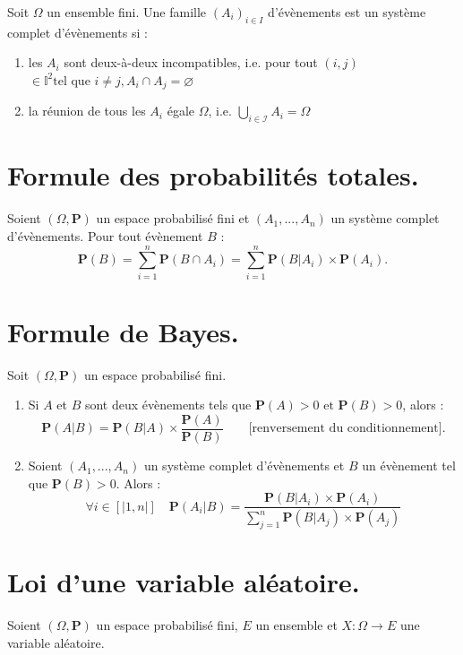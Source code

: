 \documentclass{article}
\begin{document}
Soit $\Omega$ un ensemble fini. Une famille $(A_i)_{i \in I}$ d'évènements est un système complet d'évènements si :
\begin{enumerate}[label=(\alph*)]
    \item les $ A_i $ sont deux-à-deux incompatibles, i.e. pour tout $ (i,j) $  $\in \mathbb{I}^2  \text{tel que } i \neq j, A_i \cap A_j = \varnothing $
    \item la réunion de tous les $A_i$ égale $\Omega$, i.e. $\bigcup_{i \in \mathcal{I}}A_i = \Omega$
\end{enumerate}

\section{Formule des probabilités totales.}

Soient $(\Omega, \mathbf{P})$ un espace probabilisé fini et $(A_1, ..., A_n)$ un système complet d'évènements. Pour tout évènement $B$ : 
\[
    \mathbf{P}(B) = \sum_{i=1}^{n}\mathbf{P}(B \cap A_i) = \sum_{i=1}^{n}\mathbf{P}(B|A_i)\times\mathbf{P}(A_i).
\]

\section{Formule de Bayes.}
Soit $(\Omega, \mathbf{P})$ un espace probabilisé fini. 

\begin{enumerate}[label=(\alph*)]
    \item Si $A$ et $B$ sont deux évènements tels que $\mathbf{P}(A)>0 \text{ et } \mathbf{P}(B)>0$, alors : 
    \[
        \mathbf{P}(A|B) = \mathbf{P}(B|A) \times \dfrac{\mathbf{P}(A)}{\mathbf{P}(B)} \qquad \text{[renversement du conditionnement].}
    \] 
    \item Soient $(A_1, ..., A_n)$ un système complet d'évènements et $B$ un évènement tel que $\mathbf{P}(B)>0$. Alors : 
    \[ 
        \forall i \in [|1, n|] \quad \mathbf{P}(A_i|B) = \dfrac{\mathbf{P}(B|A_i)\times\mathbf{P}(A_i)}{\displaystyle\sum_{j=1}^{n}\mathbf{P}(B|A_j)\times\mathbf{P}(A_j)}
    \]
\end{enumerate}

\section{Loi d'une variable aléatoire.}

Soient $(\Omega, \mathbf{P})$ un espace probabilisé fini, $E$ un ensemble et $X : \Omega \longrightarrow E$ une variable aléatoire. 
\end{document}
